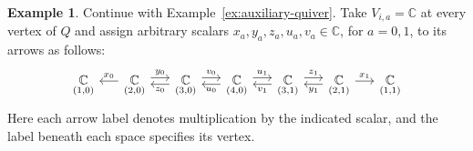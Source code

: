 \documentclass[12pt,reqno]{amsart}
\numberwithin{equation}{section}
\theoremstyle{definition}
\newtheorem{example}[theorem]{Example}
\theoremstyle{remark}
\theoremstyle{plain}
\theoremstyle{plain}
\begin{document}
\begin{example}\label{ex:auxiliary-module}
Continue with Example~\ref{ex:auxiliary-quiver}.
Take $V_{i,a}=\mathbb C$ at every vertex of $Q$ and assign
arbitrary scalars $x_a,y_a,z_a,u_a,v_a\in\mathbb C$,
for $a=0,1$, to its arrows as follows:
\[
\begin{tikzcd}[column sep=1.5em]
    \underset{(1,0)}{\mathbb C}
    & \underset{(2,0)}{\mathbb C}
        \arrow[l,"x_0"']
        \arrow[r,shift left=.6ex,"y_0"]
    & \underset{(3,0)}{\mathbb C}
        \arrow[l,shift left=.6ex,"z_0"]
        \arrow[r,shift left=.6ex,"v_0"]
    & \underset{(4,0)}{\mathbb C}
        \arrow[l,shift left=.6ex,"u_0"]
        \arrow[r,shift left=.6ex,"u_1"]
    & \underset{(3,1)}{\mathbb C}
        \arrow[l,shift left=.6ex,"v_1"]
        \arrow[r,shift left=.6ex,"z_1"]
    & \underset{(2,1)}{\mathbb C}
        \arrow[l,shift left=.6ex,"y_1"]
        \arrow[r,"x_1"]
    & \underset{(1,1)}{\mathbb C}
\end{tikzcd}
\]
Here each arrow label denotes multiplication by the
indicated scalar, and the label beneath each space
specifies its vertex.


\end{example}
\end{document}
